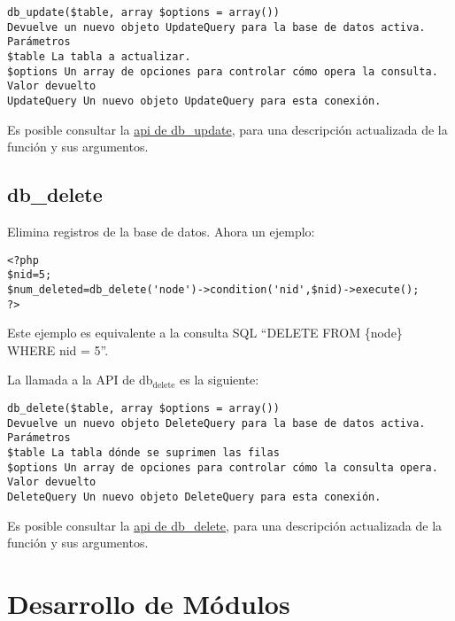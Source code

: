 \documentclass[11pt]{article}
\begin{document}
\begin{verbatim}
db_update($table, array $options = array()) 
Devuelve un nuevo objeto UpdateQuery para la base de datos activa.
Parámetros
$table La tabla a actualizar.
$options Un array de opciones para controlar cómo opera la consulta.
Valor devuelto
UpdateQuery Un nuevo objeto UpdateQuery para esta conexión.
\end{verbatim}



Es posible consultar la \href{http://api.drupal.org/api/drupal/includes--database--database.inc/function/db_update/7}{api de db\_update}, para una descripción
actualizada de la función y sus argumentos.

\subsection{db\_delete}
\label{sec-1.16}


Elimina registros de la base de datos. Ahora un ejemplo:


\begin{verbatim}
<?php
$nid=5;                             
$num_deleted=db_delete('node')->condition('nid',$nid)->execute();
?>
\end{verbatim}



Este ejemplo es equivalente a la consulta SQL ``DELETE FROM \{node\}
WHERE nid = 5''.

La llamada a la API de db$_{\mathrm{delete}}$ es la siguiente:


\begin{verbatim}
db_delete($table, array $options = array()) 
Devuelve un nuevo objeto DeleteQuery para la base de datos activa.
Parámetros
$table La tabla dónde se suprimen las filas
$options Un array de opciones para controlar cómo la consulta opera.
Valor devuelto
DeleteQuery Un nuevo objeto DeleteQuery para esta conexión.
\end{verbatim}



Es posible consultar la \href{http://api.drupal.org/api/drupal/includes--database--database.inc/function/db_delete/7}{api de db\_delete}, para una descripción
actualizada de la función y sus argumentos.

\section{Desarrollo de Módulos}
\label{sec-2}
\end{document}
